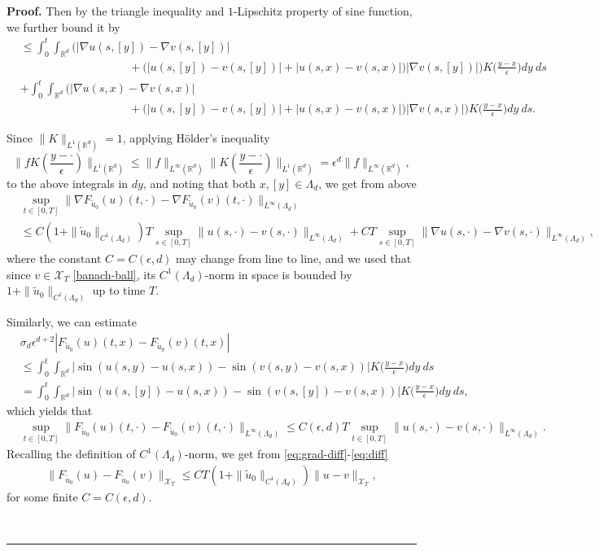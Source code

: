 \documentclass[10pt,a4paper]{amsart}
\newcommand{\R}{\mathbb{R}}
\newcommand{\cX}{\mathcal{X}}
\newcommand{\ep}{\epsilon}
\newenvironment{proof}[1][Proof]{\noindent\textbf{#1.} }{\ \rule{0.5em}{0.5em}}
\newcommand{\red}[1]{{#1}}
\begin{document}
\begin{proof}
Then by the triangle inequality and $1$-Lipschitz property of sine function, we further bound it by
\begin{align*}
& \le \int_0^t\int_{\R^d}\Big(|\nabla u(s,[y])-\nabla v(s,[y])| \\
&\hspace{4cm}+\big(|u(s,[y])-v(s,[y])|+|u(s,x)-v(s,x)|\big)|\nabla v(s,[y])|\Big)K\Big(\frac{y-x}{\ep}\Big)dy\:ds\\
&+\int_0^t\int_{\R^d}\Big(|\nabla u(s,x)-\nabla v(s,x)| \\
&\hspace{4cm}+\big(|u(s,[y])-v(s,[y])|+|u(s,x)-v(s,x)|\big)|\nabla v(s,x)|\Big)K\Big(\frac{y-x}{\ep}\Big)dy\:ds.
\end{align*}


Since $\|K\|_{L^1(\R^d)}=1$, applying \red{H\"older's inequality $$\|fK(\frac{y - \cdot}{\ep})\|_{L^1(\R^d)}\le \|f\|_{L^\infty(\R^d)}\|K(\frac{y-\cdot}{\ep})\|_{L^1(\R^d)} = \ep^d\|f\|_{L^\infty(\R^d)},$$ to the above integrals in $dy$, and noting that both $x,[y]\in\Lambda_d$}, we get from above
\begin{align}\label{eq:grad-diff}
&\sup_{t\in[0,T]}\|\nabla F_{\tilde u_0}(u)(t,\cdot)-\nabla F_{\tilde u_0}(v)(t,\cdot)\|_{L^\infty(\Lambda_d)}\\
&\le C\left(1+\|\tilde u_0\|_{C^1(\Lambda_d)}\right)T \sup_{s\in[0,T]}\|u(s,\cdot)-v(s,\cdot)\|_{L^\infty(\Lambda_d)}+CT \sup_{s\in[0,T]}\|\nabla u(s,\cdot)-\nabla v(s,\cdot)\|_{L^\infty(\Lambda_d)}, \nonumber
\end{align} 
where the constant $C=C(\ep, d)$ may change from line to line, and we used that since $v\in \cX_T$ \eqref{banach-ball}, its $C^1(\Lambda_d)$-norm in space is bounded by $1+\|\tilde u_0\|_{C^1(\Lambda_d)}$ up to time $T$.

Similarly, we can estimate 
\begin{align*}
&\sigma_d\ep^{d+2} |F_{\tilde u_0}(u)(t,x)-F_{\tilde u_0}(v)(t,x)| \\
& \leq \int_0^t\int_{\R^d}\Big|\sin\left(u(s,y)-u(s,x)\right)-\sin\left(v(s,y)-v(s,x)\right)\Big|K\Big(\frac{y-x}{\ep}\Big)dy\:ds \\
&= \red{\int_0^t\int_{\R^d}\Big|\sin\left(u(s,[y])-u(s,x)\right)-\sin\left(v(s,[y])-v(s,x)\right)\Big|K\Big(\frac{y-x}{\ep}\Big)dy\:ds,}
\end{align*}
which yields that
\begin{align}\label{eq:diff}
&\sup_{t\in[0,T]}\|F_{\tilde u_0}(u)(t,\cdot)-F_{\tilde u_0}(v)(t,\cdot)\|_{L^\infty(\Lambda_d)}\le C(\ep, d)T \sup_{t\in[0,T]}\|u(s,\cdot)-v(s,\cdot)\|_{L^\infty(\Lambda_d)}.
\end{align}
Recalling the definition of $C^1(\Lambda_d)$-norm, we get from \eqref{eq:grad-diff}-\eqref{eq:diff}
\begin{align*}
\|F_{\tilde u_0}(u)-F_{\tilde u_0}(v)\|_{\cX_T}\le CT\left(1+\|\tilde u_0\|_{C^1(\Lambda_d)}\right)\|u-v\|_{\cX_T},
\end{align*}
for some finite $C=C(\ep, d)$. 


\end{proof}
\end{document}
